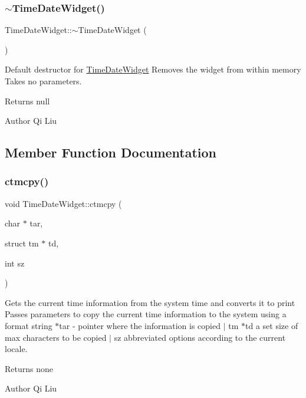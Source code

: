 \subsubsection{\texorpdfstring{$\sim$\+Time\+Date\+Widget()}{~TimeDateWidget()}}
{\footnotesize\ttfamily Time\+Date\+Widget\+::$\sim$\+Time\+Date\+Widget (\begin{DoxyParamCaption}{ }\end{DoxyParamCaption})}



Default destructor for \mbox{\hyperlink{class_time_date_widget}{Time\+Date\+Widget}}  Removes the widget from within memory  Takes no parameters. 

\begin{DoxyReturn}{Returns}
null 
\end{DoxyReturn}
\begin{DoxyAuthor}{Author}
Qi Liu 
\end{DoxyAuthor}


\subsection{Member Function Documentation}
\mbox{\label{class_time_date_widget_a7435370eaf6bfbbef35708a0444505a1}} 
\subsubsection{\texorpdfstring{ctmcpy()}{ctmcpy()}}
{\footnotesize\ttfamily void Time\+Date\+Widget\+::ctmcpy (\begin{DoxyParamCaption}\item[{char $\ast$}]{tar,  }\item[{struct tm $\ast$}]{td,  }\item[{int}]{sz }\end{DoxyParamCaption})}



Gets the current time information from the system time and converts it to print  Passes parameters to copy the current time information to the system using a format string  $\ast$tar -\/ pointer where the information is copied $\vert$ tm $\ast$td a set size of max characters to be copied $\vert$ sz abbreviated options according to the current locale. 

\begin{DoxyReturn}{Returns}
none 
\end{DoxyReturn}
\begin{DoxyAuthor}{Author}
Qi Liu 
\end{DoxyAuthor}
\mbox{\label{class_time_date_widget_ad904a60e864d47cde0ab456d47b2cd15}} 
